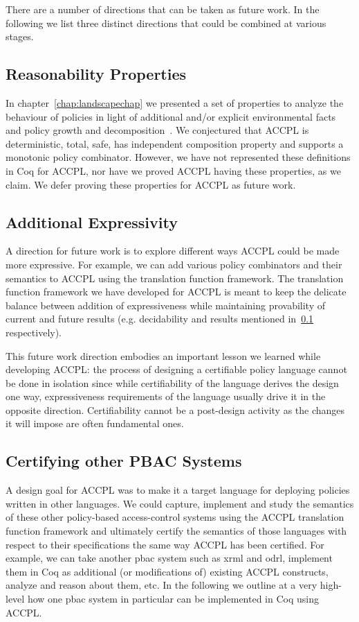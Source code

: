 There are a number of directions that can be taken as future work. In the following we list three distinct directions that could be combined at various stages.

 
\subsection{Reasonability Properties}\label{subsec:reasonprop}

In chapter~\ref{chap:landscapechap} we presented a set of properties to analyze the behaviour of policies in light of additional and/or explicit environmental facts and policy growth and decomposition~\cite{Tschantz}. We conjectured that \ac{ACCPL} is deterministic, total, safe, has independent composition property and supports a monotonic policy combinator. However, we have not represented these definitions in Coq for \ac{ACCPL}, nor have we proved \ac{ACCPL} having these properties, as we claim. We defer proving these properties for \ac{ACCPL} as future work. 

\subsection{Additional Expressivity}

A direction for future work is to explore different ways \ac{ACCPL} could be made more expressive. For example, we can add various policy combinators and their semantics to \ac{ACCPL} using the translation function framework. The translation function framework we have developed for \ac{ACCPL} is meant to keep the delicate balance between addition of expressiveness while maintaining provability of current and future results (e.g. decidability and results mentioned in~\ref{subsec:reasonprop} respectively).

This future work direction embodies an important lesson we learned while developing \ac{ACCPL}: the process of designing a certifiable policy language cannot be done in isolation since while certifiability of the language derives the design one way, expressiveness requirements of the language usually drive it in the opposite direction. Certifiability cannot be a post-design activity as the changes it will impose are often fundamental ones.

\subsection{Certifying other PBAC Systems}

A design goal for \ac{ACCPL} was to make it a target language for deploying policies written in other languages. We could capture, implement and study the semantics of these other policy-based access-control systems using the \ac{ACCPL} translation function framework and ultimately certify the semantics of those languages with respect to their specifications the same way \ac{ACCPL} has been certified. For example, we can take another \ac{pbac} system such as \ac{xrml} and \ac{odrl}, implement them in Coq as additional (or modifications of) existing \ac{ACCPL} constructs, analyze and reason about them, etc. In the following we outline at a very high-level how one \ac{pbac} system in particular can be implemented in Coq using \ac{ACCPL}.

